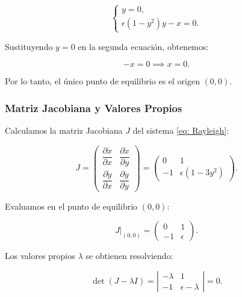 \begin{equation}
    \begin{cases}
        y = 0, \\
        \epsilon \left(1 - y^2\right) y - x = 0.
    \end{cases}
\end{equation}

Sustituyendo \( y = 0 \) en la segunda ecuación, obtenemos:

\begin{equation}
    - x = 0 \implies x = 0.
\end{equation}

Por lo tanto, el único punto de equilibrio es el origen \((0, 0)\).

\subsubsection{Matriz Jacobiana y Valores Propios}

Calculamos la matriz Jacobiana \( J \) del sistema \eqref{eq: Rayleigh}:

\begin{equation}
    J =
    \begin{pmatrix}
        \dfrac{\partial \dot{x}}{\partial x} & \dfrac{\partial \dot{x}}{\partial y} \\
        \dfrac{\partial \dot{y}}{\partial x} & \dfrac{\partial \dot{y}}{\partial y}
    \end{pmatrix}
    =
    \begin{pmatrix}
        0 & 1 \\
        -1 & \epsilon \left(1 - 3 y^2\right)
    \end{pmatrix}.
\end{equation}

Evaluamos en el punto de equilibrio \((0, 0)\):

\begin{equation}
    J|_{(0,0)} =
    \begin{pmatrix}
        0 & 1 \\
        -1 & \epsilon
    \end{pmatrix}.
\end{equation}

Los valores propios \(\lambda\) se obtienen resolviendo:

\begin{equation}
    \det(J - \lambda I) = \left| \begin{array}{cc}
        -\lambda & 1 \\
        -1 & \epsilon - \lambda
    \end{array} \right| = 0.
\end{equation}

